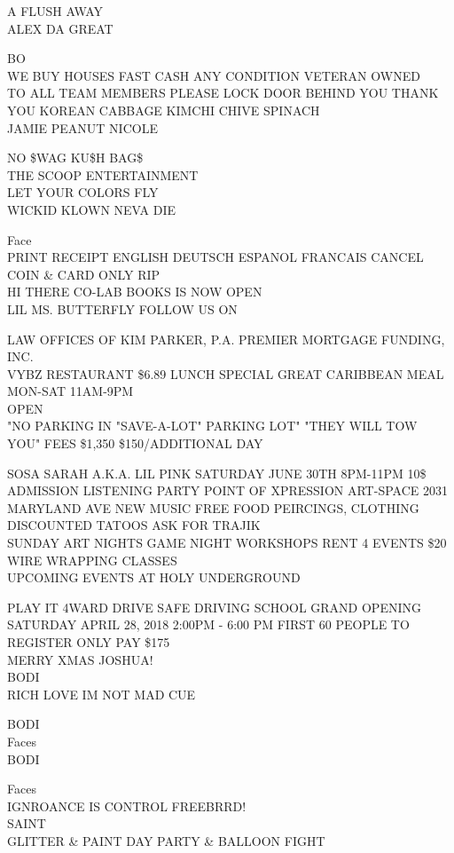 \documentclass[10pt,letterpaper]{article}
\begin{document}
A FLUSH AWAY\\
ALEX DA GREAT

BO\\
WE BUY HOUSES FAST CASH ANY CONDITION VETERAN OWNED\\
TO ALL TEAM MEMBERS PLEASE LOCK DOOR BEHIND YOU THANK YOU KOREAN CABBAGE KIMCHI CHIVE SPINACH\\
JAMIE PEANUT NICOLE

NO \$WAG KU\$H BAG\$\\
THE SCOOP ENTERTAINMENT\\
LET YOUR COLORS FLY\\
WICKID KLOWN NEVA DIE

Face\\
PRINT RECEIPT ENGLISH DEUTSCH ESPANOL FRANCAIS CANCEL COIN \& CARD ONLY RIP\\
HI THERE CO{-}LAB BOOKS IS NOW OPEN\\
LIL MS. BUTTERFLY FOLLOW US ON

LAW OFFICES OF KIM PARKER, P.A. PREMIER MORTGAGE FUNDING, INC.\\
VYBZ RESTAURANT \$6.89 LUNCH SPECIAL GREAT CARIBBEAN MEAL MON{-}SAT 11AM{-}9PM\\
OPEN\\
"NO PARKING IN "SAVE{-}A{-}LOT" PARKING LOT"  "THEY WILL TOW YOU"  FEES \$1,350 \$150/ADDITIONAL DAY

SOSA SARAH A.K.A. LIL PINK SATURDAY JUNE 30TH 8PM{-}11PM 10\$ ADMISSION LISTENING PARTY POINT OF XPRESSION ART{-}SPACE 2031 MARYLAND AVE NEW MUSIC FREE FOOD PEIRCINGS, CLOTHING DISCOUNTED TATOOS ASK FOR TRAJIK\\
SUNDAY ART NIGHTS GAME NIGHT WORKSHOPS RENT 4 EVENTS \$20 WIRE WRAPPING CLASSES\\
UPCOMING EVENTS AT HOLY UNDERGROUND

PLAY IT 4WARD DRIVE SAFE DRIVING SCHOOL GRAND OPENING SATURDAY APRIL 28, 2018 2:00PM {-} 6:00 PM FIRST 60 PEOPLE TO REGISTER ONLY PAY \$175\\
MERRY XMAS JOSHUA!\\
BODI\\
RICH LOVE IM NOT MAD CUE

BODI\\
Faces\\
BODI

Faces\\
IGNROANCE IS CONTROL FREEBRRD!\\
SAINT\\
GLITTER \& PAINT DAY PARTY \& BALLOON FIGHT
\end{document}
